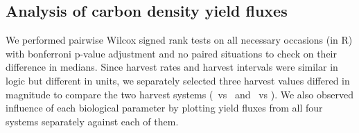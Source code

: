 \documentclass[../thesis.tex]{subfiles} %
\begin{document}
\subsection{Analysis of carbon density yield fluxes}
We performed pairwise Wilcox signed rank tests on all necessary occasions (in R) with bonferroni p-value adjustment and no paired situations to check on their difference in medians.  Since harvest rates and harvest intervals were similar in logic but different in units, we separately selected three harvest values differed in magnitude to compare the two harvest systems (\PBH\ vs \PoH\ and \PBN\ vs \PoN).  We also observed influence of each biological parameter by plotting yield fluxes from all four systems separately against each of them.
\end{document}

